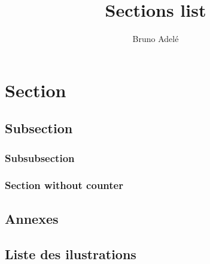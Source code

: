\documentclass[a4paper, 12pt]{article}
\title{\Huge Sections list}
\author{Bruno Adelé}
\date{}
\begin{document}
\maketitle
\tableofcontents

\section{Section}
\lipsum[1][-2]

\subsection{Subsection}
\lipsum[2][-2]

\subsubsection{Subsubsection}
\lipsum[3][-2]

\subsubsection*{Section without counter}
\lipsum[4][-2]

\begin{appendix}
	\section{Annexes}
	\subsection{Liste des ilustrations}
	\listoffigures
	\listoftables
\end{appendix}
\end{document}
